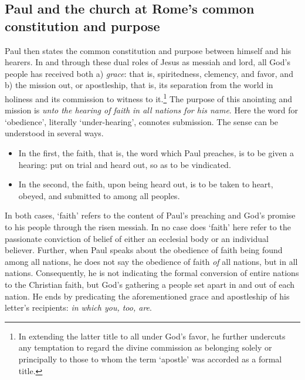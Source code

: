 \subsection{Paul and the church at Rome's common constitution and purpose}
Paul then states the common constitution and purpose between himself and his hearers. In and through these dual roles of Jesus as messiah and lord, all God's people has received both a) \emph{grace}: that is, spiritedness, clemency, and favor, and b) the mission out, or apostleship, that is, its separation from the world in holiness and its commission to witness to it.\footnote{In extending the latter title to all under God's favor, he further undercuts any temptation to regard the divine commission as belonging solely or principally to those to whom the term `apostle' was accorded as a formal title.} The purpose of this anointing and mission is \emph{unto the hearing of faith in all nations for his name}. Here the word for `obedience', literally `under-hearing', connotes submission. The sense can be understood in several ways. 
\begin{itemize}
	\item In the first, the faith, that is, the word which Paul preaches, is to be given a hearing: put on trial and heard out, so as to be vindicated.
	\item In the second, the faith, upon being heard out, is to be taken to heart, obeyed, and submitted to among all peoples.
\end{itemize}

In both cases, `faith' refers to the content of Paul's preaching and God's promise to his people through the risen messiah. In no case does `faith' here refer to the passionate conviction of belief of either an ecclesial body or an individual believer. Further, when Paul speaks about the obedience of faith being found among all nations, he does not say the obedience of faith \emph{of} all nations, but {in} all nations. Consequently, he is not indicating the formal conversion of entire nations to the Christian faith, but God's gathering a people set apart in and out of each nation. He ends by predicating the aforementioned grace and apostleship of his letter's recipients: \emph{in which you, too, are}.

